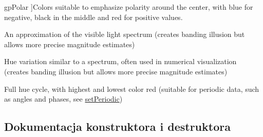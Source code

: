\begin{Desc}
\begin{description}
{gp\+Polar\hypertarget{class_q_c_p_color_gradient_aed6569828fee337023670272910c9072ab7414ce4e36dc3e82e0132a7f0f41b52}{}\label{class_q_c_p_color_gradient_aed6569828fee337023670272910c9072ab7414ce4e36dc3e82e0132a7f0f41b52}
}]Colors suitable to emphasize polarity around the center, with blue for negative, black in the middle and red for positive values. \item[{\em 
gp\+Spectrum\hypertarget{class_q_c_p_color_gradient_aed6569828fee337023670272910c9072ad63adc100ef46f6b4a8a6deacec4642f}{}\label{class_q_c_p_color_gradient_aed6569828fee337023670272910c9072ad63adc100ef46f6b4a8a6deacec4642f}
}]An approximation of the visible light spectrum (creates banding illusion but allows more precise magnitude estimates) \item[{\em 
gp\+Jet\hypertarget{class_q_c_p_color_gradient_aed6569828fee337023670272910c9072a5f8a9e67b64c17ddfe4f069fe2b9fb02}{}\label{class_q_c_p_color_gradient_aed6569828fee337023670272910c9072a5f8a9e67b64c17ddfe4f069fe2b9fb02}
}]Hue variation similar to a spectrum, often used in numerical visualization (creates banding illusion but allows more precise magnitude estimates) \item[{\em 
gp\+Hues\hypertarget{class_q_c_p_color_gradient_aed6569828fee337023670272910c9072a30efe58407acfb67939032f70213a130}{}\label{class_q_c_p_color_gradient_aed6569828fee337023670272910c9072a30efe58407acfb67939032f70213a130}
}]Full hue cycle, with highest and lowest color red (suitable for periodic data, such as angles and phases, see \hyperlink{class_q_c_p_color_gradient_a39d6448155fc00a219f239220d14bb39}{set\+Periodic}) \end{description}
\end{Desc}


\subsection{Dokumentacja konstruktora i destruktora}
